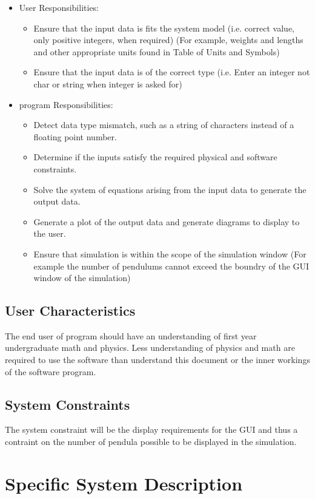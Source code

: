 \documentclass[12pt]{article}
\begin{document}
\begin{itemize}
\item User Responsibilities:
\begin{itemize}
\item Ensure that the input data is fits the system model (i.e. correct value,
only positive integers, when required) 
(For example, weights and lengths and other appropriate units found in 
Table of Units and Symbols)
\item Ensure that the input data is of the correct type 
(i.e. Enter an integer not char or string when integer is asked for)
\end{itemize}
\item \progname program Responsibilities:
\begin{itemize}
\item Detect data type mismatch, such as a string of characters instead of a
  floating point number.
\item Determine if the inputs satisfy the required physical and software 
  constraints.
\item Solve the system of equations arising from the input data to generate 
  the output data.
\item Generate a plot of the output data and generate diagrams 
to display to the user.
\item Ensure that simulation is within the scope of the simulation window 
(For example the number of pendulums cannot exceed the boundry of the
GUI window of the simulation)
\end{itemize}
\end{itemize}

\subsection{User Characteristics}
The end user of \progname program should have an understanding of first year 
undergraduate math and physics. Less understanding of physics and math are
required to use the software than understand
this document or the inner workings of the software program.

\subsection{System Constraints}
The system constraint will be the display requirements for the GUI and thus 
a contraint on the number of pendula possible to be displayed 
in the simulation.

\newpage
\section{Specific System Description}
\end{document}
